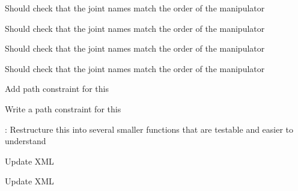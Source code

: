 
\begin{DoxyRefList}
\item[Member \mbox{\hyperlink{namespacetesseract__planning_a5479a76ec33cda8924d0e54d336e5ccc}{tesseract\+\_\+planning\+::Default\+Descartes\+Problem\+Generator}} (const std\+::string \&name, const \mbox{\hyperlink{structtesseract__planning_1_1PlannerRequest}{Planner\+Request}} \&request, const Descartes\+Plan\+Profile\+Map$<$ Float\+Type $>$ \&plan\+\_\+profiles)]\label{todo__todo000006}%
%
Should check that the joint names match the order of the manipulator 

\label{todo__todo000005}%
%
Should check that the joint names match the order of the manipulator  
\item[Member \mbox{\hyperlink{namespacetesseract__planning_aad1ed7198d10eba864130666e92d9b1f}{tesseract\+\_\+planning\+::Default\+Trajopt\+Ifopt\+Problem\+Generator}} (const std\+::string \&name, const \mbox{\hyperlink{structtesseract__planning_1_1PlannerRequest}{Planner\+Request}} \&request, const Traj\+Opt\+Ifopt\+Plan\+Profile\+Map \&plan\+\_\+profiles, const Traj\+Opt\+Ifopt\+Composite\+Profile\+Map \&composite\+\_\+profiles)]\label{todo__todo000041}%
%
Should check that the joint names match the order of the manipulator 

\label{todo__todo000040}%
%
Should check that the joint names match the order of the manipulator 

\label{todo__todo000039}%
%
Add path constraint for this 

\label{todo__todo000038}%
%
Write a path constraint for this 

\label{todo__todo000037}%
%
\+: Restructure this into several smaller functions that are testable and easier to understand  
\item[Member \mbox{\hyperlink{classtesseract__planning_1_1DescartesDefaultPlanProfile_a8bbf9dd170dfc5da44f4117d74ca7a6a}{tesseract\+\_\+planning\+::Descartes\+Default\+Plan\+Profile$<$ Float\+Type $>$\+::Descartes\+Default\+Plan\+Profile}} (const tinyxml2\+::\+XMLElement \&xml\+\_\+element)]\label{todo__todo000002}%
%
Update XML 

\label{todo__todo000001}%
%
Update XML 


\end{DoxyRefList}
